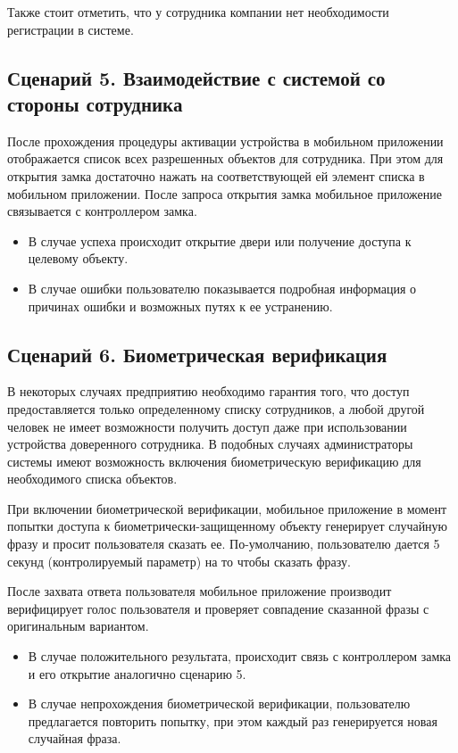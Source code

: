 Также стоит отметить, что у сотрудника компании нет необходимости регистрации в системе.

\subsection{Сценарий 5. Взаимодействие с системой со стороны сотрудника} \label{subsect2_3_5}

После прохождения процедуры активации устройства в мобильном приложении отображается список всех разрешенных объектов для сотрудника. При этом для открытия замка достаточно нажать на соответствующей ей элемент списка в мобильном приложении. 
После запроса открытия замка мобильное приложение связывается с контроллером замка.

\begin{itemize}
	\item В случае успеха происходит открытие двери или получение доступа к целевому объекту. 
	\item В случае ошибки пользователю показывается подробная информация о причинах ошибки и возможных путях к ее устранению.
\end{itemize}

\subsection{Сценарий 6. Биометрическая верификация} \label{subsect2_3_6}

В некоторых случаях предприятию необходимо гарантия того, что доступ предоставляется только определенному списку сотрудников, а любой другой человек не имеет возможности получить доступ даже при использовании устройства доверенного сотрудника. В подобных случаях администраторы системы имеют возможность включения биометрическую верификацию для необходимого списка объектов.
 
При включении биометрической верификации, мобильное приложение в момент попытки доступа к биометрически-защищенному объекту генерирует случайную фразу и просит пользователя сказать ее. По-умолчанию, пользователю дается 5 секунд (контролируемый параметр) на то чтобы сказать фразу. 

После захвата ответа пользователя мобильное приложение производит верифицирует голос пользователя и проверяет совпадение сказанной фразы с оригинальным вариантом. 

\begin{itemize}
	\item В случае положительного результата, происходит связь с контроллером замка и его открытие аналогично сценарию 5. 
	\item В случае непрохождения биометрической верификации, пользователю предлагается повторить попытку, при этом каждый раз генерируется новая случайная фраза.
\end{itemize}

